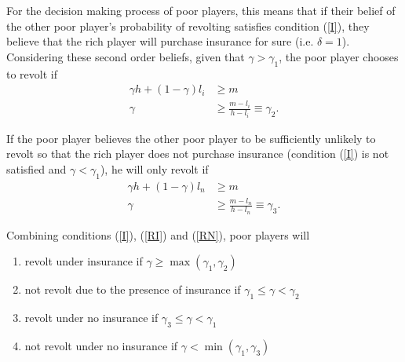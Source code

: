 \documentclass[12pt]{article}
\begin{document}
	For the decision making process of poor players, this means that if their 
	belief of the other poor player's probability of revolting satisfies 
	condition (\ref{I}), they believe that the rich player will purchase 
	insurance for sure (i.e. $\delta=1$). Considering these second order 
	beliefs, given that $\gamma>\gamma_1$, the poor player chooses to revolt if
	\begin{align*}
		\gamma h + (1-\gamma)l_i &\geq m\\
		\gamma &\geq \frac{m-l_i}{h-l_i} \equiv \gamma_2. \tag{RI}\label{RI}
	\end{align*}
	
	If the poor player believes the other poor player to be sufficiently 
	unlikely to revolt so that the rich player does not purchase insurance 
	(condition (\ref{I}) is not satisfied and $\gamma<\gamma_1$), he will only 
	revolt if
	\begin{align*}
		\gamma h + (1-\gamma)l_n &\geq m\\
		\gamma &\geq \frac{m-l_n}{h-l_n} \equiv \gamma_3. \tag{RN}\label{RN}
	\end{align*}
	
	Combining conditions (\ref{I}), (\ref{RI}) and (\ref{RN}), poor players will
	\begin{enumerate}
		\item revolt under insurance if $\gamma \geq \max (\gamma_1, \gamma_2)$
		\item not revolt due to the presence of insurance if $\gamma_1 \leq 
		\gamma < \gamma_2$
		\item revolt under no insurance if $\gamma_3 \leq \gamma < \gamma_1$
		\item not revolt under no insurance if $\gamma < \min (\gamma_1, 
		\gamma_3)$
	\end{enumerate}
	
\end{document}
